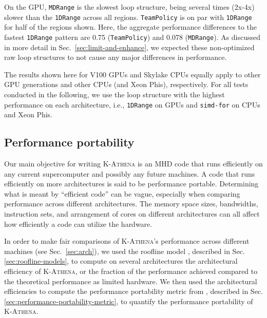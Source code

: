 \documentclass[10pt,journal,compsoc]{IEEEtran}
\newcommand{\textcode}[1]{\textsc{#1}}
\newcommand{\kathena}{\textcode{K-Athena}\xspace}
\begin{document}
On the GPU, \texttt{MDRange} is the slowest loop structure, being several times (2x-4x)
slower than the \texttt{1DRange} across all regions.
\texttt{TeamPolicy} is on par with \texttt{1DRange} for half of the regions shown.
Here, the aggregate performance differences to the fastest \texttt{1DRange} pattern
are 0.75 (\texttt{TeamPolicy}) and 0.078 (\texttt{MDRange}). 
As discussed in more detail in Sec.~\ref{sec:limit-and-enhance}, we expected these
non-optimized raw loop structures to not cause any major differences in performance.

The results shown here for V100 GPUs and Skylake CPUs equally apply to other
GPU generations and other CPUs (and Xeon Phis), respectively.
For all tests conducted in the following, we use the loop structure with the highest
performance on each architecture, i.e., \texttt{1DRange} on GPUs and \texttt{simd-for}
on CPUs and Xeon Phis.

\subsection{Performance portability}
\label{sec:performance-portability}

Our main objective for writing \kathena is an MHD code that runs efficiently on
any current supercomputer and possibly any future machines.  A code
that runs efficiently on more architectures is said to be performance portable.
Determining what is meant by ``efficient code'' can be vague, especially when
comparing performance across different architectures. The memory space sizes,
bandwidths, instruction sets, and arrangement of cores on different architectures
can all affect how efficiently a code can utilize the hardware.  

In order to make fair comparisons of \kathena's performance across different
machines (see Sec.~\ref{sec:arch}), we used the roofline model \cite{williams_roofline_2009}, described
in Sec. \ref{sec:roofline-models}, to compute on several architectures the
architectural efficiency of \kathena, or the fraction of the performance
achieved compared to the theoretical performance as limited hardware.  We then
used the architectural efficiencies to compute the performance portability
metric from \cite{Pennycook2019}, described in Sec.
\ref{sec:performance-portability-metric}, to quantify the
performance portability of \kathena.
\end{document}
